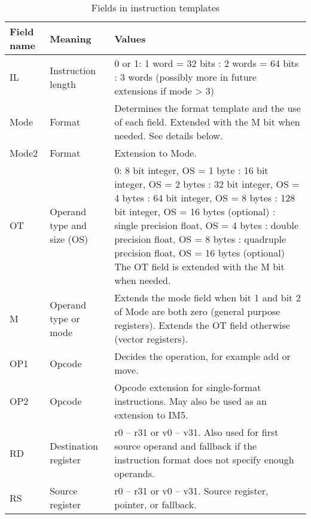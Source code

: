 \documentclass[forwardcom.tex]{subfiles}
\begin{document}
\begin{longtable} {|p{16mm}|p{16mm}|p{85mm}|}
\caption{Fields in instruction templates} \label{table:fieldsInTemplates} \\
\endfirsthead
\endhead
\hline
\bfseries Field name & \bfseries Meaning & \bfseries Values  \\
\hline
IL & Instruction length & 0 or 1: 1 word = 32 bits \newline
2: 2 words = 64 bits \newline
3: 3 words (possibly more in future extensions if mode > 3)  \\
\hline
Mode & Format & Determines the format template and the use of each field. 
Extended with the M bit when needed. \newline 
See details below. \\
\hline
Mode2 & Format & Extension to Mode. \\
\hline
OT & Operand type and size (OS) & 
0: 8 bit integer, OS = 1 byte  \newline
1: 16 bit integer, OS = 2 bytes \newline
2: 32 bit integer, OS = 4 bytes \newline
3: 64 bit integer, OS = 8 bytes \newline
4: 128 bit integer, OS = 16 bytes (optional) \newline
5: single precision float, OS = 4 bytes \newline
6: double precision float, OS = 8 bytes \newline
7: quadruple precision float, OS = 16 bytes (optional) \newline
The OT field is extended with the M bit when needed. \\
\hline
M & Operand type or mode & Extends the mode field when bit 1 and bit 2 of Mode are both zero (general purpose registers). Extends the OT field otherwise (vector registers).  \\
\hline
OP1 & Opcode & Decides the operation, for example add or move.  \\
\hline
OP2 & Opcode & Opcode extension for single-format instructions. \newline
               May also be used as an extension to IM5. \\
\hline
RD & Destination register & r0 – r31 or v0 – v31. Also used for first source operand and fallback if the instruction format does not specify enough operands. \\
\hline
RS & Source register & r0 – r31 or v0 – v31. Source register, pointer, or fallback. \\

\end{longtable}
\end{document}

